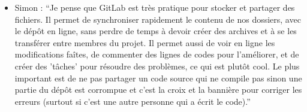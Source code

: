 \begin{itemize}
                    \vspace*{0,4 cm}
        
                    \item Simon : \enquote{Je pense que GitLab est très pratique pour stocker et partager des fichiers. Il permet de synchroniser rapidement le contenu de nos dossiers, avec le dépôt en ligne, sans perdre de temps à devoir créer des archives et à se les transférer entre membres du projet. Il permet aussi de voir en ligne les modifications faîtes, de commenter des lignes de codes pour l'améliorer, et de créer des 'tâches' pour résoudre des problèmes, ce qui est plutôt cool. Le plus important est de ne pas partager un code source qui ne compile pas sinon une partie du dépôt est corrompue et c'est la croix et la bannière pour corriger les erreurs (surtout si c'est une autre personne qui a écrit le code).}
        
                \end{itemize}
                
                \clearpage

